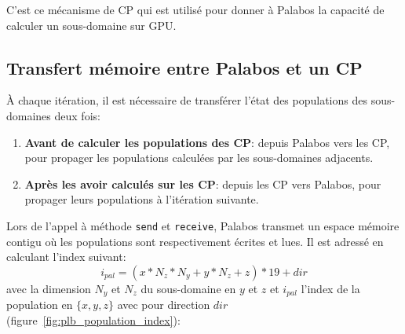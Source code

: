 C'est ce mécanisme de \ac{CP} qui est utilisé pour donner à Palabos la capacité de calculer un sous-domaine sur \acs{GPU}.

\subsection{Transfert mémoire entre Palabos et un \acs{CP} }\label{title-transfert_palabos_cp}
À chaque itération, il est nécessaire de transférer l'état des populations des sous-domaines deux fois:
\begin{enumerate}
\item \textbf{Avant de calculer les populations des \ac{CP}}: depuis Palabos vers les \ac{CP}, pour propager les populations calculées par les sous-domaines adjacents.
\item \textbf{Après les avoir calculés sur les \ac{CP}}: depuis les \ac{CP} vers Palabos, pour propager leurs populations à l'itération suivante.
\end{enumerate}

Lors de l'appel à méthode \texttt{send} et \texttt{receive}, Palabos transmet un espace mémoire contigu où les populations sont respectivement écrites et lues. Il est adressé en calculant l'index suivant:
\begin{equation}
i_{pal} = ( x*N_z*N_y + y*N_z + z) * 19 + dir
\end{equation}
avec la dimension  $N_y$ et $N_z$ du sous-domaine en $y$ et $z$ et $i_{pal}$ l'index de la population en $\{x,y,z\}$ avec pour direction $dir$ (figure~\ref{fig:plb_population_index}):

